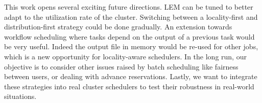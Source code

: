 \documentclass[conference]{IEEEtran}
\begin{document}
This work opens several exciting future directions.
LEM can be tuned to better adapt to the utilization rate of the cluster.
Switching between a locality-first and distribution-first strategy could be done 
gradually.
An extension towards workflow scheduling where tasks depend on the output of a previous task would be very useful.
Indeed the output file in memory would be re-used for other jobs, which is a 
new opportunity for locality-aware schedulers.
In the long run, our objective is to consider other issues raised by batch scheduling like
fairness between users, or dealing with advance reservations.
Lastly, we want to integrate these strategies into real cluster schedulers
to test their robustness in real-world situations.



\end{document}
